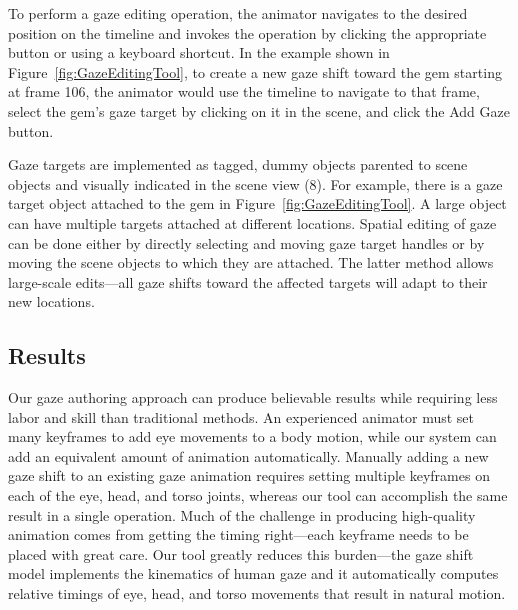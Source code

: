 To perform a gaze editing operation, the animator navigates to the desired position on the timeline and invokes the operation by clicking the appropriate button or using a keyboard shortcut. In the example shown in Figure~\ref{fig:GazeEditingTool}, to create a new gaze shift toward the gem starting at frame 106, the animator would use the timeline to navigate to that frame, select the gem's gaze target by clicking on it in the scene, and click the Add Gaze button.

Gaze targets are implemented as tagged, dummy objects parented to scene objects and visually indicated in the scene view (8). For example, there is a gaze target object attached to the gem in Figure~\ref{fig:GazeEditingTool}. A large object can have multiple targets attached at different locations. Spatial editing of gaze can be done either by directly selecting and moving gaze target handles or by moving the scene objects to which they are attached. The latter method allows large-scale edits---all gaze shifts toward the affected targets will adapt to their new locations.

\subsection{Results}
\label{sec:GazeEditingResults}

Our gaze authoring approach can produce believable results while requiring less labor and skill than traditional methods. An experienced animator must set many keyframes to add eye movements to a body motion, while our system can add an equivalent amount of animation automatically. Manually adding a new gaze shift to an existing gaze animation requires setting multiple keyframes on each of the eye, head, and torso joints, whereas our tool can accomplish the same result in a single operation. Much of the challenge in producing high-quality animation comes from getting the timing right---each keyframe needs to be placed with great care. Our tool greatly reduces this burden---the gaze shift model implements the kinematics of human gaze and it automatically computes relative timings of eye, head, and torso movements that result in natural motion.

